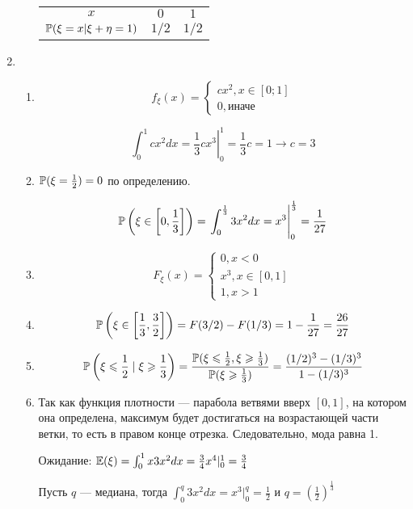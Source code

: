 \begin{enumerate}
\begin{enumerate}
\begin{center}
\begin{tabular}{ccc}
\toprule
$x$ & $0$ & $1$ \\
$\P(\xi = x | \xi + \eta = 1)$ & $1/2$ & $1/2$ \\ 
\bottomrule
\end{tabular}
\end{center}
\end{enumerate}

\item
\begin{enumerate}
\item
\[
f_\xi(x) =
\begin{cases}
cx^2 , x \in [0;1] \\
0 , \text{иначе}
\end{cases}
\]

\[
\int_{0}^{1}cx^2 dx= \left. \frac{1}{3}c x^3 \right|_0^1 = \frac{1}{3} c = 1 \to c = 3
\]

\item
$\P(\xi = \frac{1}{2}) = 0$ по определению.

\[
\P\left(\xi \in \left[0, \frac{1}{3}\right]\right) = \left. \int_{0}^{\frac{1}{3}} 3x^2 dx = x^3 \right|_0^{\frac{1}{3}}  = \frac{1}{27}
\]
\item
\[
F_\xi(x) =
\begin{cases}
0, x < 0\\
x^3, x \in [0, 1]\\
1, x > 1
\end{cases}
\]

\item
\[
  \P\left(\xi \in \left[\frac{1}{3}, \frac{3}{2}\right]\right) = F(3/2) - F(1/3) = 1 - \frac{1}{27} = \frac{26}{27}
\]
\item
\[
	\P\left(\xi \le \frac{1}{2} \mid  \xi \ge \frac{1}{3}\right) = \frac{\P(\xi \le \frac{1}{2} ,  \xi \ge \frac{1}{3})}{\P(\xi \ge \frac{1}{3})} = \frac{(1/2)^3 - (1/3)^3}{1 - (1/3)^3}
\]


\item
Так как функция плотности — парабола ветвями вверх $[0, 1]$, на котором она определена,
максимум будет достигаться на возрастающей части ветки, то есть в правом конце отрезка.
Следовательно, мода равна 1.


Ожидание:
$\E(\xi) = \int_{0}^{1} x 3x^2 dx = \frac{3}{4} x^4 |_0^1 = \frac{3}{4}$

Пусть $q$ — медиана, тогда
$\int_{0}^q 3 x^2 dx = x^3  |_0^q = \frac{1}{2}$ и $q = \left(\frac{1}{2}\right)^\frac{1}{3}$
\end{enumerate}


\end{enumerate}
